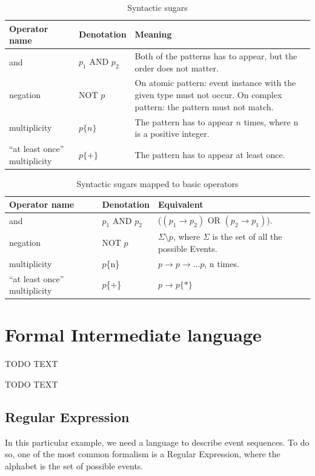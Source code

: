 		\begin{table}
		\caption{Syntactic sugars}		
		\label{tab:cep:veplsugar}
		\begin{tabularx}{\textwidth}{llX}
				\toprule
				Operator name &	Denotation & Meaning \\
				\midrule
				and & $p_1$ AND $p_2$ & Both of the patterns has to appear, but the order does not matter.\\
				negation & NOT $p$ & On atomic pattern: event instance with the given type must not occur. On complex pattern: the pattern must not match. \\
				multiplicity & $p\{n\}$ & The pattern has to appear $n$ times, where n is a positive integer.\\
				``at least once'' multiplicity & $p\{+\}$ & The pattern has to appear at least once. \\
				\bottomrule
			\end{tabularx}
		\end{table}
		
		\begin{table}
			\caption{Syntactic sugars mapped to basic operators}		
			\label{tab:cep:veplsugartobasic}
			\begin{tabularx}{\textwidth}{llX}
				\toprule
				Operator name & Denotation & Equivalent \\
				\midrule
				and & $p_1$ AND $p_2$ & ($(p_1 \rightarrow p_2)$ OR $(p_2 \rightarrow p_1)$). \\
				negation & NOT $p$ & $\Sigma \setminus p$, where $\Sigma$ is the set of all the possible Events. \\
				multiplicity & $p$\{n\} & $p \rightarrow p \rightarrow \dots p$, n times. \\
				``at least once'' multiplicity & $p$\{+\} & $p \rightarrow p\{\ast\}$ \\
				\bottomrule
			\end{tabularx}
		\end{table}

		
	\section{Formal Intermediate language}
		TODO TEXT
		
		TODO TEXT
		\subsection{Regular Expression}
		
			In this particular example, we need a language to describe event sequences. To do so, one of the most common
			formalism is a Regular Expression, where the alphabet is the set of possible events.
		
